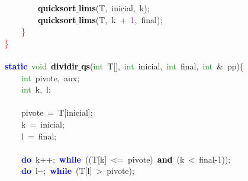\mbox{}\ \ \ \ \ \ \ \ \textbf{\textcolor{Black}{quicksort$\_$lims}}\textcolor{BrickRed}{(}T\textcolor{BrickRed}{,}\ inicial\textcolor{BrickRed}{,}\ k\textcolor{BrickRed}{);} \\
\mbox{}\ \ \ \ \ \ \ \ \textbf{\textcolor{Black}{quicksort$\_$lims}}\textcolor{BrickRed}{(}T\textcolor{BrickRed}{,}\ k\ \textcolor{BrickRed}{+}\ \textcolor{Purple}{1}\textcolor{BrickRed}{,}\ final\textcolor{BrickRed}{);} \\
\mbox{}\ \ \ \ \textcolor{Red}{\}} \\
\mbox{}\textcolor{Red}{\}} \\
\mbox{} \\
\mbox{}\textbf{\textcolor{Blue}{static}}\ \textcolor{ForestGreen}{void}\ \textbf{\textcolor{Black}{dividir$\_$qs}}\textcolor{BrickRed}{(}\textcolor{ForestGreen}{int}\ T\textcolor{BrickRed}{[],}\ \textcolor{ForestGreen}{int}\ inicial\textcolor{BrickRed}{,}\ \textcolor{ForestGreen}{int}\ final\textcolor{BrickRed}{,}\ \textcolor{ForestGreen}{int}\ \textcolor{BrickRed}{\&}\ pp\textcolor{BrickRed}{)}\textcolor{Red}{\{} \\
\mbox{}\ \ \ \ \textcolor{ForestGreen}{int}\ pivote\textcolor{BrickRed}{,}\ aux\textcolor{BrickRed}{;} \\
\mbox{}\ \ \ \ \textcolor{ForestGreen}{int}\ k\textcolor{BrickRed}{,}\ l\textcolor{BrickRed}{;} \\
\mbox{}\ \ \ \  \\
\mbox{}\ \ \ \ pivote\ \textcolor{BrickRed}{=}\ T\textcolor{BrickRed}{[}inicial\textcolor{BrickRed}{];} \\
\mbox{}\ \ \ \ k\ \textcolor{BrickRed}{=}\ inicial\textcolor{BrickRed}{;} \\
\mbox{}\ \ \ \ l\ \textcolor{BrickRed}{=}\ final\textcolor{BrickRed}{;} \\
\mbox{}\ \ \ \  \\
\mbox{}\ \ \ \ \textbf{\textcolor{Blue}{do}}\ k\textcolor{BrickRed}{++;}\ \textbf{\textcolor{Blue}{while}}\ \textcolor{BrickRed}{((}T\textcolor{BrickRed}{[}k\textcolor{BrickRed}{]}\ \textcolor{BrickRed}{\textless{}=}\ pivote\textcolor{BrickRed}{)}\ \textbf{\textcolor{Black}{and}}\ \textcolor{BrickRed}{(}k\ \textcolor{BrickRed}{\textless{}}\ final\textcolor{BrickRed}{-}\textcolor{Purple}{1}\textcolor{BrickRed}{));} \\
\mbox{}\ \ \ \ \textbf{\textcolor{Blue}{do}}\ l\textcolor{BrickRed}{-\/-;}\ \textbf{\textcolor{Blue}{while}}\ \textcolor{BrickRed}{(}T\textcolor{BrickRed}{[}l\textcolor{BrickRed}{]}\ \textcolor{BrickRed}{\textgreater{}}\ pivote\textcolor{BrickRed}{);} \\
